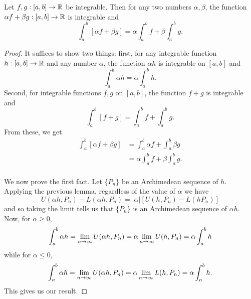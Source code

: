 \documentclass[letterpaper, twoside, 12pt]{book}
\begin{document}
\begin{theorem}
  Let \(f,g:[a,b]\to\mathbb R\) be integrable. Then for any two numbers
  \(\alpha,\beta\), the function \(\alpha f+\beta g:[a,b]\to\mathbb R\) is
  integrable and
  \[
    \int_a^b[\alpha f+\beta g]=\alpha\int_a^b f + \beta\int_a^b g
  .\]
\end{theorem}

\begin{proof}
    It suffices to show two things: first, for any integrable function 
    \(h: [a,b] \to \mathbb R\) and any number \(\alpha\), the function 
    \(\alpha h\) is integrable on \([a,b]\) and 
    \[ \int_a^b \alpha h = \alpha \int_a^b h .\]
    Second, for integrable functions \(f, g\) on \([a,b]\), the function
    \(f + g\) is integrable and 
    \[ \int_a^b [f + g] = \int_a^b f + \int_a^b g .\]
    From these, we get
    \begin{align*} 
        \int_a^b[ \alpha f + \beta g ] &= \int_a^b \alpha f + \int_a^b \beta g \\
                                       &= \alpha \int_a^b f + \beta \int_a^b g .\\
    \end{align*}


    We now prove the first fact. Let \(\{P_n\}\) be an Archimedean sequence
    of \(h\). Applying the previous lemma, regardless of the
    value of \(\alpha\) we have
    \[ U(\alpha h, P_n) - L(\alpha h, P_n) = |\alpha| [U(h, P_n) - L(h P_n)] \]
    and so taking the limit tells us that \(\{P_n\}\) is an Archimedean 
    sequence of \(\alpha h\). Now, for \(\alpha \geq 0\),
    \[ \int_a^b \alpha h = \lim_{n \to \infty} U(\alpha h, P_n) = \alpha \lim_{n \to \infty} U(h, P_n) = \alpha \int_a^b h\]
    while for \(\alpha \leq 0\),
    \[ \int_a^b \alpha h = \lim_{n \to \infty} U(\alpha h, P_n) = \alpha \lim_{n \to \infty} L(h, P_n) = \alpha \int_a^b h .\]
    This gives us our result.



\end{proof}
\end{document}
